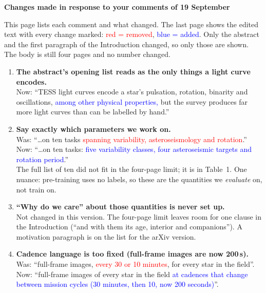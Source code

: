 \documentclass[10pt]{article}
\newcommand{\old}[1]{\textcolor{red}{#1}}
\newcommand{\new}[1]{\textcolor{blue}{#1}}
\begin{document}
{\large\textbf{Changes made in response to your comments of 19 September}}

This page lists each comment and what changed. The last page shows the edited text with every change
marked: \old{red = removed}, \new{blue = added}. Only the abstract and the first paragraph of the
Introduction changed, so only those are shown. The body is still four pages and no number changed.

\begin{enumerate}[leftmargin=*, itemsep=5pt]

\item \textbf{The abstract's opening list reads as the only things a light curve encodes.}\\
Now: ``TESS light curves encode a star's pulsation, rotation, binarity and oscillations,
\new{among other physical properties,} but the survey produces far more light curves than can be
labelled by hand.''

\item \textbf{Say exactly which parameters we work on.}\\
Was: ``\ldots on ten tasks \old{spanning variability, asteroseismology and rotation}.''\\
Now: ``\ldots on ten tasks: \new{five variability classes, four asteroseismic targets and rotation
period}.''\\
The full list of ten did not fit in the four-page limit; it is in Table~1. One nuance: pre-training
uses no labels, so these are the quantities we \emph{evaluate} on, not train on.

\item \textbf{``Why do we care'' about those quantities is never set up.}\\
Not changed in this version. The four-page limit leaves room for one clause in the Introduction (``and
with them its age, interior and companions''). A motivation paragraph is on the list for the arXiv
version.

\item \textbf{Cadence language is too fixed (full-frame images are now 200\,s).}\\
Was: ``full-frame images, \old{every 30 or 10 minutes}, for every star in the field''.\\
Now: ``full-frame images of every star in the field \new{at cadences that change between mission
cycles (30 minutes, then 10, now 200 seconds)}''.


\end{enumerate}
\end{document}
